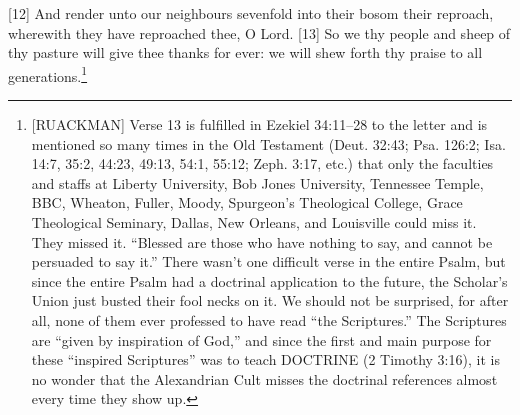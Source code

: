 [12] \textcolor[rgb]{0.00,0.00,1.00}{And render unto our neighbours sevenfold into their bosom their reproach, wherewith they have reproached thee, O Lord.}
[13] \textcolor[rgb]{0.00,0.00,1.00}{So we thy people and sheep of thy pasture will give thee thanks for ever: we will shew forth thy praise to all generations.}\footnote{[RUACKMAN] Verse 13 is fulfilled in Ezekiel 34:11--28 to the letter and is mentioned so many times in the Old Testament (Deut. 32:43; Psa. 126:2; Isa. 14:7, 35:2, 44:23, 49:13, 54:1, 55:12; Zeph. 3:17, etc.) that only the faculties and staffs at Liberty University, Bob Jones University, Tennessee Temple, BBC, Wheaton, Fuller, Moody, Spurgeon’s Theological College, Grace Theological Seminary, Dallas, New Orleans, and Louisville could miss it. They missed it. “Blessed are those who have nothing to say, and cannot be persuaded to say it.” There wasn’t one difficult verse in the entire Psalm, but since the entire Psalm had a doctrinal application to the future, the Scholar’s Union just busted their fool necks on it. We should not be surprised, for after all, none of them ever professed to have read “the Scriptures.” The Scriptures are “given by inspiration of God,” and since the first and main purpose for these “inspired Scriptures” was to teach DOCTRINE (2 Timothy 3:16), it is no wonder that the Alexandrian Cult misses the doctrinal references almost every time they show up.\cite{Ruckman1992Psalms}}

